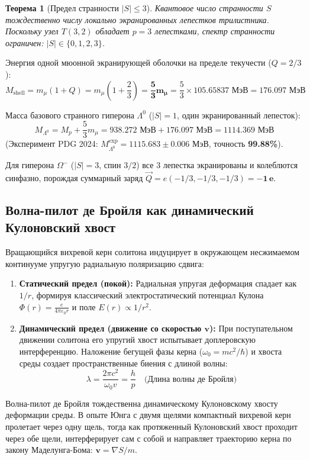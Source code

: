 \documentclass[12pt,a4paper]{article}
\newtheorem{theorem}{Теорема}
\begin{document}
	\begin{theorem}[Предел странности $|S| \le 3$]
		Квантовое число странности $S$ тождественно числу локально экранированных лепестков трилистника. Поскольку узел $T(3,2)$ обладает $p=3$ лепестками, спектр странности ограничен: $|S| \in \{0, 1, 2, 3\}$.
	\end{theorem}
	
	Энергия одной мюонной экранирующей оболочки на пределе текучести ($Q = 2/3$):
	\begin{equation}
		M_{\text{shell}} = m_\mu (1 + Q) = m_\mu \left(1 + \frac{2}{3}\right) = \mathbf{\frac{5}{3} m_\mu} = \frac{5}{3} \times 105.65837 \text{ МэВ} = \mathbf{176.097 \text{ МэВ}}
	\end{equation}
	
	Масса базового странного гиперона $\Lambda^0$ ($|S|=1$, один экранированный лепесток):
	\begin{equation}
		M_{\Lambda^0} = M_p + \frac{5}{3} m_\mu = 938.272 \text{ МэВ} + 176.097 \text{ МэВ} = \mathbf{1114.369 \text{ МэВ}}
	\end{equation}
	(Эксперимент PDG 2024: $M_{\Lambda^0}^{\text{exp}} = \mathbf{1115.683 \pm 0.006 \text{ МэВ}}$, точность \textbf{99.88\%}).
	
	Для гиперона $\Omega^-$ ($|S|=3$, спин $3/2$) все 3 лепестка экранированы и колеблются синфазно, порождая суммарный заряд $\vec{Q} = e(-1/3, -1/3, -1/3) = \mathbf{-1 \, e}$.
	
	\subsection{Волна-пилот де Бройля как динамический Кулоновский хвост}
	Вращающийся вихревой керн солитона индуцирует в окружающем несжимаемом континууме упругую радиальную поляризацию сдвига:
	\begin{enumerate}
		\item \textbf{Статический предел (покой):} Радиальная упругая деформация спадает как $1/r$, формируя классический электростатический потенциал Кулона $\Phi(r) = \frac{e}{4\pi\varepsilon_0 r}$ и поле $E(r) \propto 1/r^2$.
		\item \textbf{Динамический предел (движение со скоростью $\mathbf{v}$):} При поступательном движении солитона его упругий хвост испытывает доплеровскую интерференцию. Наложение бегущей фазы керна ($\omega_0 = mc^2/\hbar$) и хвоста среды создает пространственные биения с длиной волны:
		\begin{equation}
			\lambda = \frac{2\pi c^2}{\omega_0 v} = \frac{h}{p} \quad \mathbf{\text{(Длина волны де Бройля)}}
		\end{equation}
	\end{enumerate}
	Волна-пилот де Бройля тождественна динамическому Кулоновскому хвосту деформации среды. В опыте Юнга с двумя щелями компактный вихревой керн пролетает через одну щель, тогда как протяженный Кулоновский хвост проходит через обе щели, интерферирует сам с собой и направляет траекторию керна по закону Маделунга-Бома: $\mathbf{v} = \nabla S / m$.
	
\end{document}
